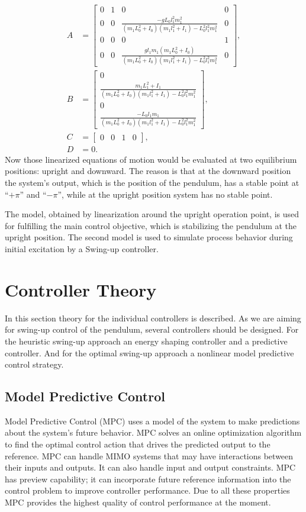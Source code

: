 \begin{subequations}\label{linmatrices}
	\begin{align}
	A &=\begin{bmatrix}0&1&0&0\\
	0&0&\frac{-gL_0l_1^2m_1^2}{(m_1L_0^2+I_0)(m_1l_1^2+I_1)-L_0^2l_1^2m_1^2}&0\\
	0&0&0&1\\
	0&0&\frac{gl_1m_1(m_1L_0^2+I_0)}{(m_1L_0^2+I_0)(m_1l_1^2+I_1)-L_0^2l_1^2m_1^2}&0
	\end{bmatrix},\\
	B &=	\begin{bmatrix}
	0\\ 
	\frac{m_1L_1^2+I_1}{(m_1L_0^2+I_0)(m_1l_1^2+I_1)-L_0^2l_1^2m_1^2}\\
	0\\
	\frac{-L_0l_1m_1}{(m_1L_0^2+I_0)(m_1l_1^2+I_1)-L_0^2l_1^2m_1^2}
	\end{bmatrix},\\
	C &= \begin{bmatrix}0&0&1&0\end{bmatrix},\\
	D &= 0.
	\end{align}
\end{subequations}
Now those linearized equations of motion would be evaluated at two equilibrium positions: upright and downward. The reason is that at the downward position the system's output, which is the position of the pendulum, has a stable point at “$+\pi$” and “$-\pi$”, while at the upright position system has no stable point.

The model, obtained by linearization around the upright operation point, is used for fulfilling the main control objective, which is stabilizing the pendulum at the upright position. The second model is used to simulate process behavior during initial excitation by a Swing-up controller.
\section{Controller Theory}
In this section theory for the individual controllers is described. As we are aiming for swing-up control of the pendulum, several controllers should be designed. For the heuristic swing-up approach an energy shaping controller and a predictive controller. And for the optimal swing-up approach a nonlinear model predictive control strategy.
\subsection{Model Predictive Control}\label{mpcsection}
Model Predictive Control (MPC) uses a model of the system to make predictions about the system’s future behavior. MPC solves an online optimization algorithm to find the optimal control action that drives the predicted output to the reference. MPC can handle MIMO systems that may have interactions between their inputs and outputs. It can also handle input and output constraints. MPC has preview capability; it can incorporate future reference information into the control problem to improve controller performance. Due to all these properties MPC provides the highest quality of control performance at the moment.
